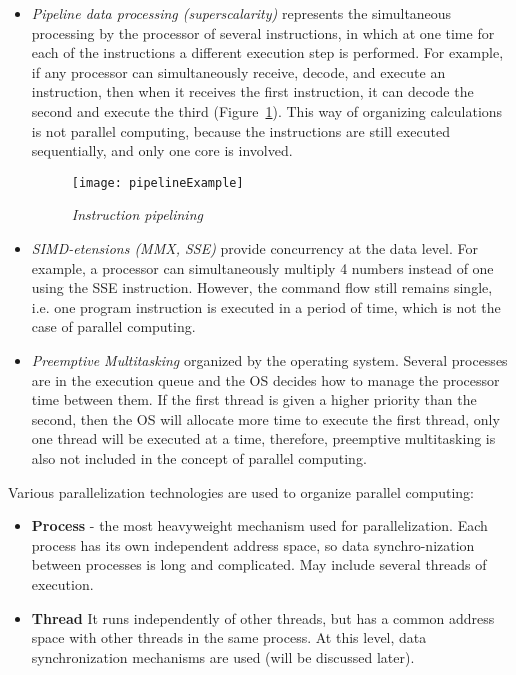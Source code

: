 {		\begin{itemize}
			\item\textit{Pipeline data processing (superscalarity)} represents the simultaneous processing by the processor of several instructions, in which at one time for each of the instructions a different execution step is performed. For example, if any processor can simultaneously receive, decode, and execute an instruction, then when it receives the first instruction, it can decode the second and execute the third (Figure~\ref {pipelineExample:image}). This way of organizing calculations is not parallel computing, because the instructions are still executed sequentially, and only one core is involved.
				\begin{figure}[H]
					\texttt{[image: pipelineExample]}
					\caption{\textit{Instruction pipelining}}
					\label{pipelineExample:image}
				\end{figure}
			\item\textit{SIMD-etensions (MMX, SSE)} provide concurrency at the data level. For example, a processor can simultaneously multiply 4 numbers instead of one using the SSE instruction. However, the command flow still remains single, i.e. one program instruction is executed in a period of time, which is not the case of parallel computing.
			\item\textit{Preemptive Multitasking} organized by the operating system. Several processes are in the execution queue and the OS decides how to manage the processor time between them. If the first thread is given a higher priority than the second, then the OS will allocate more time to execute the first thread, only one thread will be executed at a time, therefore, preemptive multitasking is also not included in the concept of parallel computing.
		\end{itemize}
	\par Various parallelization technologies are used to organize parallel computing:
		\begin{itemize}
			\item\textbf{Process} - the most heavyweight mechanism used for parallelization. Each process has its own independent address space, so data synchro-nization between processes is long and complicated. May include several threads of execution.
			\item\textbf{Thread} It runs independently of other threads, but has a common address space with other threads in the same process. At this level, data synchronization mechanisms are used (will be discussed later).

\end{itemize}}
